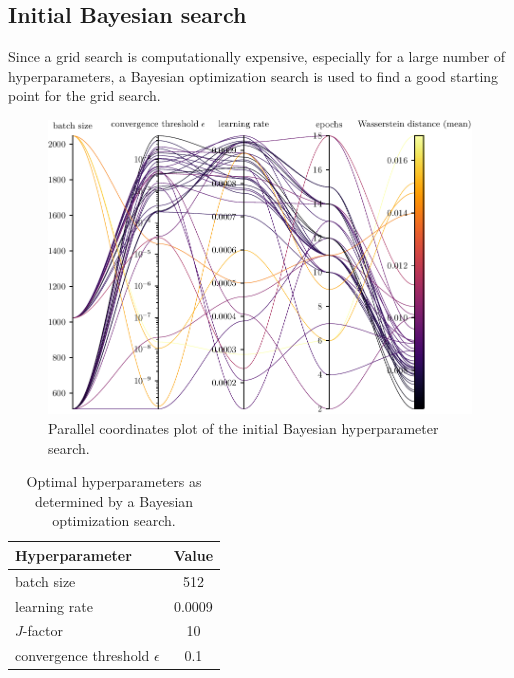 \subsection{Initial Bayesian search}
Since a grid search is computationally expensive,
  especially for a large number of hyperparameters,
a Bayesian optimization search \cite{wandb_bayesian} is used to find a good starting point for the grid search.

\begin{figure}
  \centering
  \includegraphics[scale=1]{content/plots/hyperparam/combined_pcplot_full.pdf}
  \caption{Parallel coordinates plot of the initial Bayesian hyperparameter search.}
  \label{fig:hyperparameter:bayesian}
\end{figure}

\begin{table}
    \centering
    \caption{
      Optimal hyperparameters as determined by a Bayesian optimization search.
    }
    \label{tab:hyperparameters:initial}
    \begin{tabular}{l S}
        \toprule
        Hyperparameter & {Value} \\
        \midrule
        batch size & 512 \\
        learning rate & 0.0009 \\
        $J$-factor & 10 \\
        convergence threshold $\epsilon$ & 0.1 \\
        \bottomrule
    \end{tabular}
\end{table}


